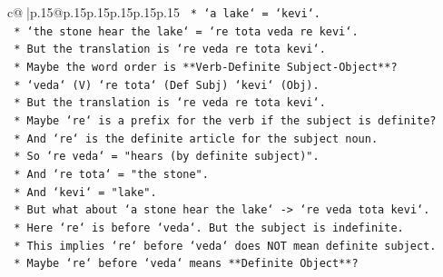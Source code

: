 \documentclass{article}
\begin{document}
{\begin{supertabular}{c@{$\;$}|p{.15\linewidth}@{}p{.15\linewidth}p{.15\linewidth}p{.15\linewidth}p{.15\linewidth}p{.15\linewidth}}
{{{\texttt{                                                                        *   `a lake` = `kevi`.} \\
\texttt{                                                                        *   `the stone hear the lake` = `re tota veda re kevi`.} \\
\texttt{                                                                        *   But the translation is `re veda re tota kevi`.} \\
\texttt{                                                                        *   Maybe the word order is **Verb{-}Definite Subject{-}Object**?} \\
\texttt{                                                                        *   `veda` (V) `re tota` (Def Subj) `kevi` (Obj).} \\
\texttt{                                                                        *   But the translation is `re veda re tota kevi`.} \\
\texttt{                                                                        *   Maybe `re` is a prefix for the verb if the subject is definite?} \\
\texttt{                                                                        *   And `re` is the definite article for the subject noun.} \\
\texttt{                                                                        *   So `re veda` = "hears (by definite subject)".} \\
\texttt{                                                                        *   And `re tota` = "the stone".} \\
\texttt{                                                                        *   And `kevi` = "lake".} \\
\texttt{                                                                        *   But what about `a stone hear the lake` {-}> `re veda tota kevi`.} \\
\texttt{                                                                        *   Here `re` is before `veda`. But the subject is indefinite.} \\
\texttt{                                                                        *   This implies `re` before `veda` does NOT mean definite subject.} \\
\texttt{                                                                        *   Maybe `re` before `veda` means **Definite Object**?} \\
}}}
\end{supertabular}}
\end{document}
